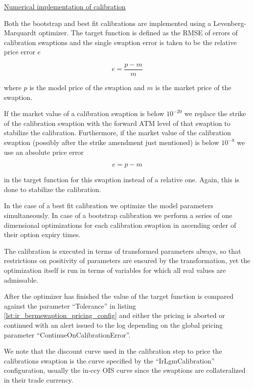 \underline{Numerical implementation of calibration}

Both the bootstrap and best fit calibrations are implemented using a Levenberg-Marquardt optimizer. The target function
is defined as the RMSE of errors of calibration swaptions and the single swaption error is taken to be the relative
price error $e$

\begin{equation}
e = \frac{p-m}{m}
\end{equation}

where $p$ is the model price of the swaption and $m$ is the market price of the swaption.

If the market value of a calibration swaption is below $10^{-20}$ we replace the strike of the calibration swaption with
the forward ATM level of that swaption to stabilize the calibration. Furthermore, if the market value of the calibration
swaption (possibly after the strike amendment just mentioned) is below $10^{-8}$ we use an absolute price error

\begin{equation}
e = {p-m}
\end{equation}

in the target function for this swaption instead of a relative one. Again, this is done to stabilize the calibration.

In the case of a best fit calibration we optimize the model parameters simultaneously. In case of a bootstrap
calibration we perform a series of one dimensional optimizations for each calibration swaption in ascending order of
their option expiry times.

The calibration is executed in terms of transformed parameters always, so that restrictions on positivity of parameters
are ensured by the transformation, yet the optimization itself is run in terms of variables for which all real values
are admissable.

After the optimizer has finished the value of the target function is compared against the parameter ``Tolerance'' in
listing \ref{lst:ir_bermswaption_pricing_config} and either the pricing is aborted or continued with an alert issued to the log
depending on the global pricing parameter ``ContinueOnCalibrationError''.

We note that the discount curve used in the calibration step to price the calibrations swaption is the curve specified
by the ``IrLgmCalibration'' configuration, usually the in-ccy OIS curve since the swaptions are collateralized in their
trade currency.


